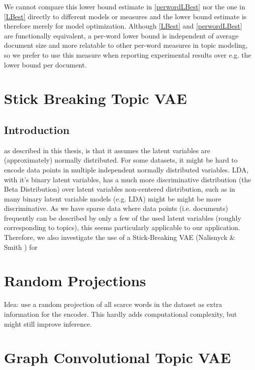 \documentclass{report}
\begin{document}
We cannot compare this lower bound estimate in \ref{perwordLBest} nor the one in \ref{LBest} directly to different models or measures and the lower bound estimate is therefore merely for model optimization. Although \ref{LBest} and \ref{perwordLBest} are functionally equivalent, a per-word lower bound is independent of average document size and more relatable to other per-word measures in topic modeling, so we prefer to use this measure when reporting experimental results over e.g. the lower bound per document.



\section{Stick Breaking Topic VAE}
\subsection{Introduction}
 as described in this thesis, is that it assumes the latent variables are (approximately) normally distributed. For some datasets, it might be hard to encode data points in multiple independent normally distributed variables. LDA, with it's binary latent variables, has a much more discriminative distribution (the Beta Distribution) over latent variables non-centered distribution, such as in many binary latent variable models (e.g. LDA) might be might be more discriminative. As we have sparse data where data points (i.e. documents) frequently can be described by only a few of the used latent variables (roughly corresponding to topics), this seems particularly applicable to our application.  \\
Therefore, we also investigate the use of a Stick-Breaking VAE (Nalisnyck \& Smith \cite{Nalisnick2016deep}) for 

\section{Random Projections}
Idea: use a random projection of all scarce words in the dataset as extra information for the encoder. This hardly adds computational complexity, but might still improve inference.

\section{Graph Convolutional Topic VAE}
\end{document}
